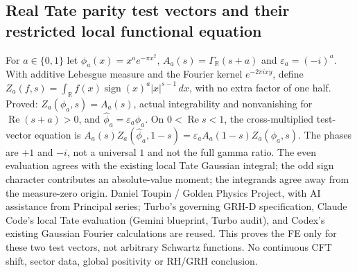 \documentclass{report}
\theoremstyle{definition}
\begin{document}
\begin{itemize}
\begin{itemize}
\section{Real Tate parity test vectors and their restricted local functional equation}
For $a\in\{0,1\}$ let $\phi_a(x)=x^a e^{-\pi x^2}$, $A_a(s)=\Gamma_{\mathbb R}(s+a)$ and $\varepsilon_a=(-i)^a$. With additive Lebesgue measure and the Fourier kernel $e^{-2\pi ixy}$, define $Z_a(f,s)=\int_{\mathbb R}f(x)\operatorname{sign}(x)^a|x|^{s-1}\,dx$, with no extra factor of one half. Proved: $Z_a(\phi_a,s)=A_a(s)$, actual integrability and nonvanishing for $\operatorname{Re}(s+a)>0$, and $\widehat\phi_a=\varepsilon_a\phi_a$. On $0<\operatorname{Re}s<1$, the cross-multiplied test-vector equation is $A_a(s)Z_a(\widehat\phi_a,1-s)=\varepsilon_a A_a(1-s)Z_a(\phi_a,s)$. The phases are $+1$ and $-i$, not a universal $1$ and not the full gamma ratio. The even evaluation agrees with the existing local Tate Gaussian integral; the odd sign character contributes an absolute-value moment; the integrands agree away from the measure-zero origin.
Daniel Toupin / Golden Physics Project, with AI assistance from Principal series; Turbo's governing GRH-D specification, Claude Code's local Tate evaluation (Gemini blueprint, Turbo audit), and Codex's existing Gaussian Fourier calculations are reused. This proves the FE only for these two test vectors, not arbitrary Schwartz functions. No continuous CFT shift, sector data, global positivity or RH/GRH conclusion.


\end{itemize}
\end{itemize}
\end{document}
